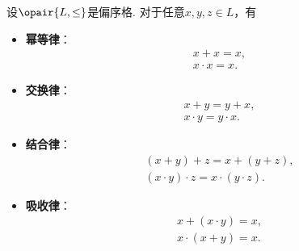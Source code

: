 \begin{theorem}
设\(\opair{L,\leq}\)是偏序格.
对于任意\(x,y,z \in L\)，有\begin{itemize}
	\item {\rm\bf 幂等律}：\begin{gather*}
		x + x = x, \\
		x \cdot x = x.
	\end{gather*}

	\item {\rm\bf 交换律}：\begin{gather*}
		x + y = y + x, \\
		x \cdot y = y \cdot x.
	\end{gather*}

	\item {\rm\bf 结合律}：\begin{gather*}
		(x + y) + z = x + (y + z), \\
		(x \cdot y) \cdot z = x \cdot (y \cdot z).
	\end{gather*}

	\item {\rm\bf 吸收律}：\begin{gather*}
		x + (x \cdot y) = x, \\
		x \cdot (x + y) = x.
	\end{gather*}
\end{itemize}
\end{theorem}
